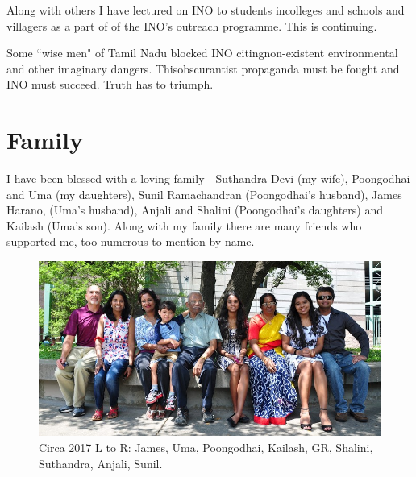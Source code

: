 Along with others I have lectured on INO to students in\break colleges and 
schools and villagers as a part of of the INO's outreach programme. This 
is continuing.
\medskip
  
Some ``wise men" of Tamil Nadu blocked INO citing\break non-existent 
environmental and other imaginary dangers. This\break obscurantist propaganda 
must be fought and INO must succeed. Truth has to triumph.


\section*{Family}

I have been blessed with a loving family - Suthandra Devi (my wife), 
Poongodhai and Uma (my daughters), Sunil Ramachandran (Poongodhai's 
husband), James Harano, (Uma's husband), Anjali and Shalini 
(Poongodhai's daughters) and Kailash (Uma's son).
Along with my family there are many friends who supported me, too 
numerous to mention by name.
\bigskip

\begin{figure}[h]
\centering
\includegraphics[width=\textwidth]{images/Rajaji-family-1.jpg}
\caption{Circa 2017 L to R: James, Uma, Poongodhai, Kailash, GR, 
Shalini, Suthandra, Anjali, Sunil.}
\end{figure}

